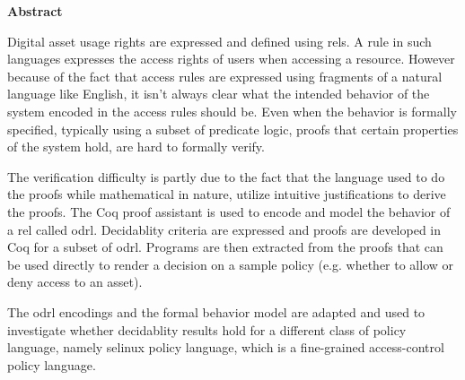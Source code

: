 
\begin{center}\textbf{Abstract}\end{center}


Digital asset usage rights are expressed and defined using \ac{rel}s. A rule in such languages expresses the access rights of users when accessing a resource. However because of the fact that access rules are expressed using fragments of a natural language like English, it isn't always clear what the intended behavior of the system encoded in the access rules should be. Even when the behavior is formally specified, typically using a subset of predicate logic, proofs that certain properties of the system hold, are hard to formally verify.

The verification difficulty is partly due to the fact that the language used to do the proofs while mathematical in nature, utilize intuitive justifications to derive the proofs. The Coq proof assistant is used to encode and model the behavior of a \ac{rel} called \ac{odrl}. Decidablity criteria are expressed and proofs are developed in Coq for a subset of \ac{odrl}. Programs are then extracted from the proofs that can be used directly to render a decision on a sample policy (e.g. whether to allow or deny access to an asset). 

The \ac{odrl} encodings and the formal behavior model are adapted and used to investigate whether decidablity results hold for a different class of policy language, namely \ac{selinux} policy language, which is a fine-grained access-control policy language.


\cleardoublepage
